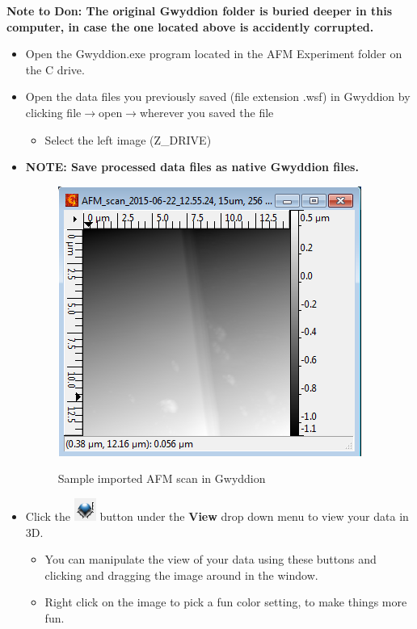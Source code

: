 \documentclass{../lab}
\begin{document}
\textbf{Note to Don: The original Gwyddion folder is buried deeper in this computer, in case the one located above is accidently corrupted.}

\begin{itemize}
    \item Open the Gwyddion.exe program located in the AFM Experiment folder on the C drive.
    
    \item Open the data files you previously saved (file extension .wsf) in Gwyddion by clicking file$\rightarrow$open$\rightarrow$wherever you saved the file
    \begin{itemize}
        \item Select the left image (Z\_DRIVE)
    \end{itemize}
    
    \item\textbf{NOTE: Save processed data files as native Gwyddion files.}
    \begin{figure}[H]
        \centering
        \href{http://experimentationlab.berkeley.edu/sites/default/files/AFMImages/40.png}{\includegraphics[width=0.5\linewidth]{images/40.png}}
        \caption{Sample imported AFM scan in Gwyddion}
    \end{figure}
    
    \item Click the \includegraphics[height=2em]{images/41.png} button under the \textbf{View} drop down menu to view your data in 3D.
    \begin{itemize}
        \item You can manipulate the view of your data using these buttons and clicking and dragging the image around in the window.
        
        \item Right click on the image to pick a fun color setting, to make things more fun.
        

\end{itemize}
\end{itemize}
\end{document}

